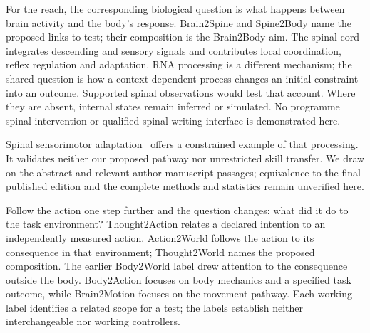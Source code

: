 For the reach, the corresponding biological question is what happens between
brain activity and the body's response. Brain2Spine and Spine2Body name the
proposed links to test; their composition is the Brain2Body aim. The spinal cord
integrates descending and sensory signals and contributes local coordination,
reflex regulation and adaptation. RNA processing is a different mechanism;
the shared question is how a context-dependent process changes an initial
constraint into an outcome. Supported spinal observations would test that
account. Where they are absent, internal states remain inferred or simulated.
No programme spinal intervention or qualified spinal-writing interface is demonstrated here.
\par\noindent \href{https://pubmed.ncbi.nlm.nih.gov/38603479/}{Spinal sensorimotor adaptation}~\cite{lavaud2024}
offers a constrained example of that processing. It validates neither our
proposed pathway nor unrestricted skill transfer. We draw on the abstract and
relevant author-manuscript passages; equivalence to the final published edition
and the complete methods and statistics remain unverified here.

Follow the action one step further and the question changes: what did it do
to the task environment? Thought2Action relates a declared intention to an
independently measured action. Action2World follows the action to its consequence
in that environment; Thought2World names the proposed composition. The earlier
Body2World label drew attention to the consequence outside the body. Body2Action
focuses on body mechanics and a specified task outcome, while Brain2Motion
focuses on the movement pathway. Each working label identifies a related scope
for a test; the labels establish neither interchangeable nor working controllers.

